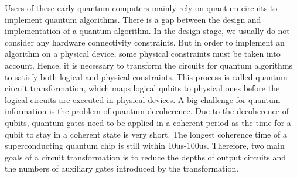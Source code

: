 \documentclass[journal]{IEEEtran}
\begin{document}
	Users of these early quantum computers mainly rely on quantum circuits to implement quantum algorithms.
	There is a gap between the design and implementation of a quantum algorithm. In the design stage, we usually do not consider any hardware connectivity constraints. But in order to implement an algorithm on a physical device, some physical constraints must be taken into account. Hence, it is necessary to transform the circuits for quantum algorithms to satisfy both logical and physical constraints. This process is called quantum circuit transformation, which maps logical qubits to physical ones before the logical circuits are executed in physical devices. A big challenge for quantum information is the problem of quantum decoherence. Due to the decoherence of qubits, quantum gates need to be applied in a coherent period as the time for a qubit to stay in a coherent state is very short. The longest coherence time of a superconducting quantum chip is still within 10us-100us. 
	Therefore, two main goals of a circuit transformation is to reduce the depths of output circuits and the numbers of auxiliary gates introduced by the transformation.  
	
	
	
\end{document}
